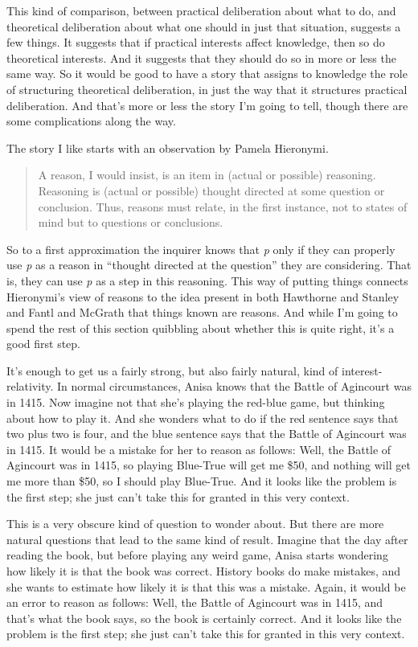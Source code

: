 \documentclass[
  11pt,
]{book}
\begin{document}
This kind of comparison, between practical deliberation about what to do, and theoretical deliberation about what one should in just that situation, suggests a few things. It suggests that if practical interests affect knowledge, then so do theoretical interests. And it suggests that they should do so in more or less the same way. So it would be good to have a story that assigns to knowledge the role of structuring theoretical deliberation, in just the way that it structures practical deliberation. And that's more or less the story I'm going to tell, though there are some complications along the way.

The story I like starts with an observation by Pamela Hieronymi.

\begin{quote}
A reason, I would insist, is an item in (actual or possible) reasoning. Reasoning is (actual or possible) thought directed at some question or conclusion. Thus, reasons must relate, in the first instance, not to states of mind but to questions or conclusions. \citep[115-6]{Hieronymi2013}
\end{quote}

So to a first approximation the inquirer knows that \emph{p} only if they can properly use \emph{p} as a reason in ``thought directed at the question'' they are considering. That is, they can use \emph{p} as a step in this reasoning. This way of putting things connects Hieronymi's view of reasons to the idea present in both Hawthorne and Stanley \citeyearpar{HawthorneStanley2008} and Fantl and McGrath \citeyearpar{FantlMcGrath2009} that things known are reasons. And while I'm going to spend the rest of this section quibbling about whether this is quite right, it's a good first step.

It's enough to get us a fairly strong, but also fairly natural, kind of interest-relativity. In normal circumstances, Anisa knows that the Battle of Agincourt was in 1415. Now imagine not that she's playing the red-blue game, but thinking about how to play it. And she wonders what to do if the red sentence says that two plus two is four, and the blue sentence says that the Battle of Agincourt was in 1415. It would be a mistake for her to reason as follows: Well, the Battle of Agincourt was in 1415, so playing Blue-True will get me \$50, and nothing will get me more than \$50, so I should play Blue-True. And it looks like the problem is the first step; she just can't take this for granted in this very context.

This is a very obscure kind of question to wonder about. But there are more natural questions that lead to the same kind of result. Imagine that the day after reading the book, but before playing any weird game, Anisa starts wondering how likely it is that the book was correct. History books do make mistakes, and she wants to estimate how likely it is that this was a mistake. Again, it would be an error to reason as follows: Well, the Battle of Agincourt was in 1415, and that's what the book says, so the book is certainly correct. And it looks like the problem is the first step; she just can't take this for granted in this very context.
\end{document}
